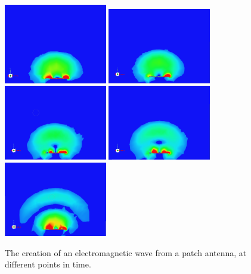 \documentclass[12pt]{article}
\begin{document}
\newpage
\begin{figure}[h]
    \centering
    \includegraphics[width=0.4\textwidth]{basic-patch-antenna-radiating-t0.png} 
    \includegraphics[width=0.4\textwidth]{basic-patch-antenna-radiating-t1.png}
    \includegraphics[width=0.4\textwidth]{basic-patch-antenna-radiating-t2.png}
    \includegraphics[width=0.4\textwidth]{basic-patch-antenna-radiating-t3.png}
    \includegraphics[width=0.4\textwidth]{basic-patch-antenna-radiating-t4.png}
    \caption{The creation of an electromagnetic wave from a patch antenna, at different points in time.}
\end{figure} 
\end{document}
